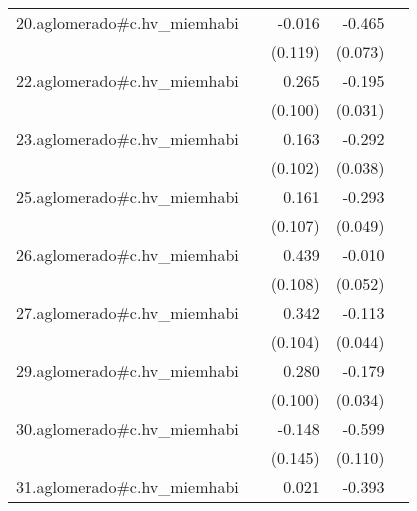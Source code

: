 {\begin{longtable}{l*{4}{D{.}{.}{-1}}}
\addlinespace
20.aglomerado#c.hv\_miemhabi&                     &      -0.016         &      -0.465\sym{***}&                     \\
            &                     &     (0.119)         &     (0.073)         &                     \\
\addlinespace
22.aglomerado#c.hv\_miemhabi&                     &       0.265\sym{**} &      -0.195\sym{***}&                     \\
            &                     &     (0.100)         &     (0.031)         &                     \\
\addlinespace
23.aglomerado#c.hv\_miemhabi&                     &       0.163         &      -0.292\sym{***}&                     \\
            &                     &     (0.102)         &     (0.038)         &                     \\
\addlinespace
25.aglomerado#c.hv\_miemhabi&                     &       0.161         &      -0.293\sym{***}&                     \\
            &                     &     (0.107)         &     (0.049)         &                     \\
\addlinespace
26.aglomerado#c.hv\_miemhabi&                     &       0.439\sym{***}&      -0.010         &                     \\
            &                     &     (0.108)         &     (0.052)         &                     \\
\addlinespace
27.aglomerado#c.hv\_miemhabi&                     &       0.342\sym{**} &      -0.113\sym{*}  &                     \\
            &                     &     (0.104)         &     (0.044)         &                     \\
\addlinespace
29.aglomerado#c.hv\_miemhabi&                     &       0.280\sym{**} &      -0.179\sym{***}&                     \\
            &                     &     (0.100)         &     (0.034)         &                     \\
\addlinespace
30.aglomerado#c.hv\_miemhabi&                     &      -0.148         &      -0.599\sym{***}&                     \\
            &                     &     (0.145)         &     (0.110)         &                     \\
\addlinespace
31.aglomerado#c.hv\_miemhabi&                     &       0.021         &      -0.393\sym{***}&                     \\

\end{longtable}}
